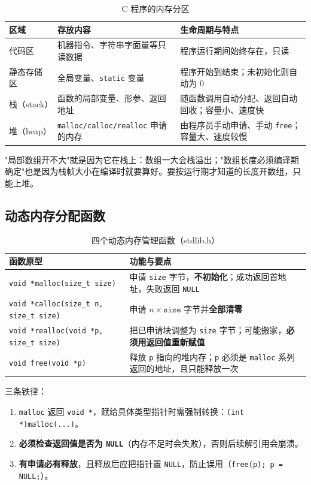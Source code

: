 \begin{table}[htbp]
\centering
\caption{C 程序的内存分区}
\footnotesize
\begin{tabularx}{\textwidth}{@{}p{2.4cm}p{4.6cm}X@{}}
\toprule
区域 & 存放内容 & 生命周期与特点 \\
\midrule
代码区 & 机器指令、字符串字面量等只读数据 & 程序运行期间始终存在，只读 \\
静态存储区 & 全局变量、\texttt{static} 变量 & 程序开始到结束；未初始化则自动为 0 \\
栈（stack） & 函数的局部变量、形参、返回地址 & 随函数调用自动分配、返回自动回收；容量小、速度快 \\
堆（heap） & \texttt{malloc/calloc/realloc} 申请的内存 & 由程序员手动申请、手动 \texttt{free}；容量大、速度较慢 \\
\bottomrule
\end{tabularx}
\end{table}

"局部数组开不大"就是因为它在栈上：数组一大会栈溢出；"数组长度必须编译期确定"也是因为栈帧大小在编译时就要算好。要按运行期才知道的长度开数组，只能上堆。

\subsection{动态内存分配函数}
\begin{table}[htbp]
\centering
\caption{四个动态内存管理函数（stdlib.h）}
\footnotesize
\begin{tabularx}{\textwidth}{@{}p{4.1cm}X@{}}
\toprule
函数原型 & 功能与要点 \\
\midrule
\texttt{void *malloc(size\_t size)} & 申请 \texttt{size} 字节，\textbf{不初始化}；成功返回首地址，失败返回 \texttt{NULL} \\
\texttt{void *calloc(size\_t n, size\_t size)} & 申请 $n\times\texttt{size}$ 字节并\textbf{全部清零} \\
\texttt{void *realloc(void *p, size\_t size)} & 把已申请块调整为 \texttt{size} 字节；可能搬家，\textbf{必须用返回值重新赋值} \\
\texttt{void free(void *p)} & 释放 \texttt{p} 指向的堆内存；\texttt{p} 必须是 \texttt{malloc} 系列返回的地址，且只能释放一次 \\
\bottomrule
\end{tabularx}
\end{table}

三条铁律：
\begin{enumerate}
  \item \texttt{malloc} 返回 \texttt{void *}，赋给具体类型指针时需强制转换：\texttt{(int *)malloc(...)}。
  \item \textbf{必须检查返回值是否为 \texttt{NULL}}（内存不足时会失败），否则后续解引用会崩溃。
  \item \textbf{有申请必有释放}，且释放后应把指针置 \texttt{NULL}，防止误用（\texttt{free(p); p = NULL;}）。
\end{enumerate}

